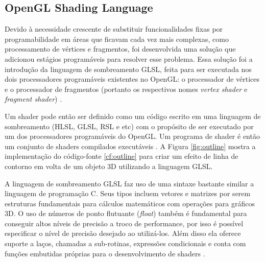 \subsection{OpenGL Shading Language}
\label{sec:glsl}

Devido à necessidade crescente de substituir funcionalidades fixas por programabilidade em áreas que ficavam cada vez mais complexas, como processamento de vértices e fragmentos, foi desenvolvida uma solução que adicionou estágios programáveis para resolver esse problema. Essa solução foi a introdução da linguagem de sombreamento \acrshort{GLSL}, feita para ser executada nos dois processadores programáveis existentes no OpenGL: o processador de vértices e o processador de fragmentos (portanto os respectivos nomes \textit{vertex shader} e \textit{fragment shader}) \cite{GLSLBook}. 

Um shader pode então ser definido como um código escrito em uma linguagem de sombreamento (HLSL, GLSL, RSL e etc) com o propósito de ser executado por um dos processadores programáveis do OpenGL. Um programa de shader é então um conjunto de shaders compilados executáveis \cite{GLSLBook}. A Figura \ref{fig:outline} mostra a implementação do código-fonte \ref{cf:outline} para criar um efeito de linha de contorno em volta de um objeto 3D utilizando a linguagem GLSL.

\begin{figure}[h!]
	\centering
\end{figure}

A linguagem de sombreamento GLSL faz uso de uma sintaxe bastante similar a linguagem de programação C. Seus tipos incluem vetores e matrizes por serem estruturas fundamentais para cálculos matemáticos com operações para gráficos 3D. O uso de números de ponto flutuante (\textit{float}) também é fundamental para conseguir altos níveis de precisão a troco de performance, por isso é possível especificar o nível de precisão desejado ao utilizá-los. Além disso ela oferece suporte a laços, chamadas a sub-rotinas, expressões condicionais e conta com funções embutidas próprias para o desenvolvimento de shaders \cite{GLSLBook}. 

